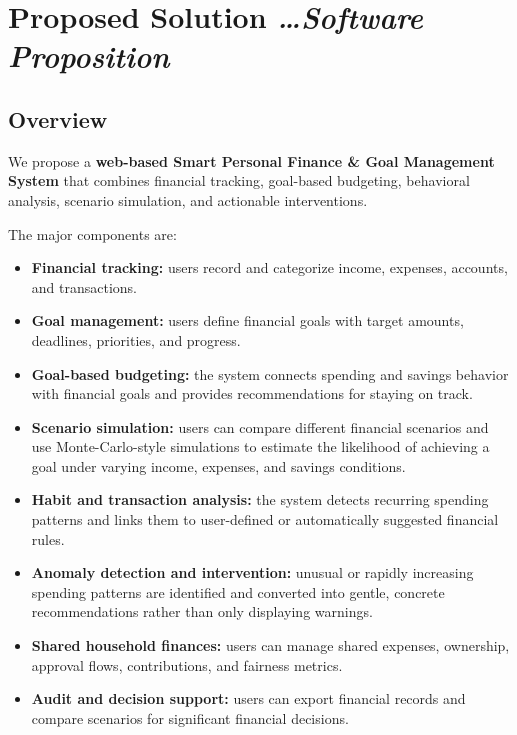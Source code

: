 \documentclass[11pt,a4paper]{article}
\newcommand{\BvrHint}[1]{%
  {\normalfont\normalsize\itshape\hfill #1}}
\begin{document}
\section{Proposed Solution%
  \BvrHint{\ldots Software Proposition}}

\subsection{Overview}

We propose a \textbf{web-based Smart Personal Finance \& Goal Management
System} that combines financial tracking, goal-based budgeting, behavioral
analysis, scenario simulation, and actionable interventions.

The major components are:

\begin{itemize}[leftmargin=0.7cm]
    \item \textbf{Financial tracking:} users record and categorize income,
    expenses, accounts, and transactions.
    
    \item \textbf{Goal management:} users define financial goals with target
    amounts, deadlines, priorities, and progress.
    
    \item \textbf{Goal-based budgeting:} the system connects spending and
    savings behavior with financial goals and provides recommendations for
    staying on track.
    
    \item \textbf{Scenario simulation:} users can compare different financial
    scenarios and use Monte-Carlo-style simulations to estimate the likelihood
    of achieving a goal under varying income, expenses, and savings conditions.
    
    \item \textbf{Habit and transaction analysis:} the system detects recurring
    spending patterns and links them to user-defined or automatically
    suggested financial rules.
    
    \item \textbf{Anomaly detection and intervention:} unusual or rapidly
    increasing spending patterns are identified and converted into gentle,
    concrete recommendations rather than only displaying warnings.
    
    \item \textbf{Shared household finances:} users can manage shared expenses,
    ownership, approval flows, contributions, and fairness metrics.
    
    \item \textbf{Audit and decision support:} users can export financial
    records and compare scenarios for significant financial decisions.
\end{itemize}
\end{document}
